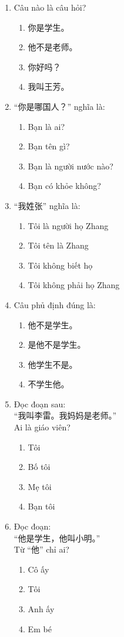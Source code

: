 \documentclass{article}
\begin{document}
\begin{CJK*}{UTF8}{gbsn}
\begin{multicols}{2}
\begin{enumerate}[label=\textbf{Câu \arabic*.}, leftmargin=*, itemsep=1.2em]
\item Câu nào là câu hỏi?
\begin{enumerate}[label=A.]
\item 你是学生。
\item 他不是老师。
\item 你好吗？
\item 我叫王芳。
\end{enumerate}

\item “你是哪国人？” nghĩa là:
\begin{enumerate}[label=A.]
\item Bạn là ai?
\item Bạn tên gì?
\item Bạn là người nước nào?
\item Bạn có khỏe không?
\end{enumerate}

\item “我姓张” nghĩa là:
\begin{enumerate}[label=A.]
\item Tôi là người họ Zhang
\item Tôi tên là Zhang
\item Tôi không biết họ
\item Tôi không phải họ Zhang
\end{enumerate}

\item Câu phủ định đúng là:
\begin{enumerate}[label=A.]
\item 他不是学生。
\item 是他不是学生。
\item 他学生不是。
\item 不学生他。
\end{enumerate}

\item Đọc đoạn sau: \\
“我叫李雷。我妈妈是老师。” \\
Ai là giáo viên?
\begin{enumerate}[label=A.]
\item Tôi
\item Bố tôi
\item Mẹ tôi
\item Bạn tôi
\end{enumerate}

\item Đọc đoạn: \\
“他是学生，他叫小明。” \\
Từ “他” chỉ ai?
\begin{enumerate}[label=A.]
\item Cô ấy
\item Tôi
\item Anh ấy
\item Em bé
\end{enumerate}


\end{enumerate}
\end{multicols}
\end{CJK*}
\end{document}
